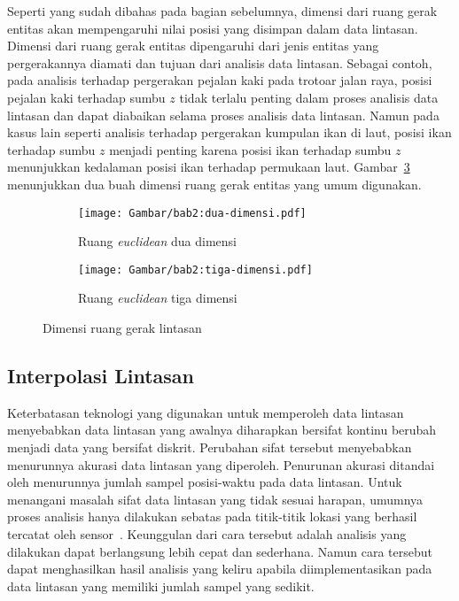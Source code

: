 Seperti yang sudah dibahas pada bagian sebelumnya, dimensi dari ruang gerak entitas akan mempengaruhi nilai posisi yang disimpan dalam data lintasan. Dimensi dari ruang gerak entitas dipengaruhi dari jenis entitas yang pergerakannya diamati dan tujuan dari analisis data lintasan. Sebagai contoh, pada analisis terhadap pergerakan pejalan kaki pada trotoar jalan raya, posisi pejalan kaki terhadap sumbu $z$ tidak terlalu penting dalam proses analisis data lintasan dan dapat diabaikan selama proses analisis data lintasan. Namun pada kasus lain seperti analisis terhadap pergerakan kumpulan ikan di laut, posisi ikan terhadap sumbu $z$ menjadi penting karena posisi ikan terhadap sumbu $z$ menunjukkan kedalaman posisi ikan terhadap permukaan laut. Gambar~\ref{bab2:ruang-gerak} menunjukkan dua buah dimensi ruang gerak entitas yang umum digunakan.

\iffalse

Pada skripsi ini, entitas yang diamati akan bergerak dalam ruang \textit{euclidean} dua dimensi yang disimbolkan sebagai $\mathbb{R}^2$\lionov{ini harusnya ada di batasan}.

\fi

\begin{figure}[b!]
    \centering
    \begin{subfigure}[htbp]{0.325\textwidth}
        \centering
        \texttt{[image: Gambar/bab2:dua-dimensi.pdf]}
        \caption{Ruang \textit{euclidean} dua dimensi}
        \label{bab2:dua-dimensi}
    \end{subfigure} \hspace{1.25cm}
    \begin{subfigure}[htbp]{0.325\textwidth}
        \centering
        \texttt{[image: Gambar/bab2:tiga-dimensi.pdf]}
        \caption{Ruang \textit{euclidean} tiga dimensi}
        \label{bab2:tiga-dimensi}
    \end{subfigure}
    \caption{Dimensi ruang gerak lintasan}
    \label{bab2:ruang-gerak}
\end{figure}

\subsection{Interpolasi Lintasan}
\label{subsec:interpolasi}

Keterbatasan teknologi yang digunakan untuk memperoleh data lintasan menyebabkan data lintasan yang awalnya diharapkan bersifat kontinu berubah menjadi data yang bersifat diskrit. Perubahan sifat tersebut menyebabkan menurunnya akurasi data lintasan yang diperoleh. Penurunan akurasi ditandai oleh menurunnya jumlah sampel posisi-waktu pada data lintasan. Untuk menangani masalah sifat data lintasan yang tidak sesuai harapan, umumnya proses analisis hanya dilakukan sebatas pada titik-titik lokasi yang berhasil tercatat oleh sensor~\cite{wiratma:trajectory}. Keunggulan dari cara tersebut adalah analisis yang dilakukan dapat berlangsung lebih cepat dan sederhana. Namun cara tersebut dapat menghasilkan hasil analisis yang keliru apabila diimplementasikan pada data lintasan yang memiliki jumlah sampel yang sedikit.

